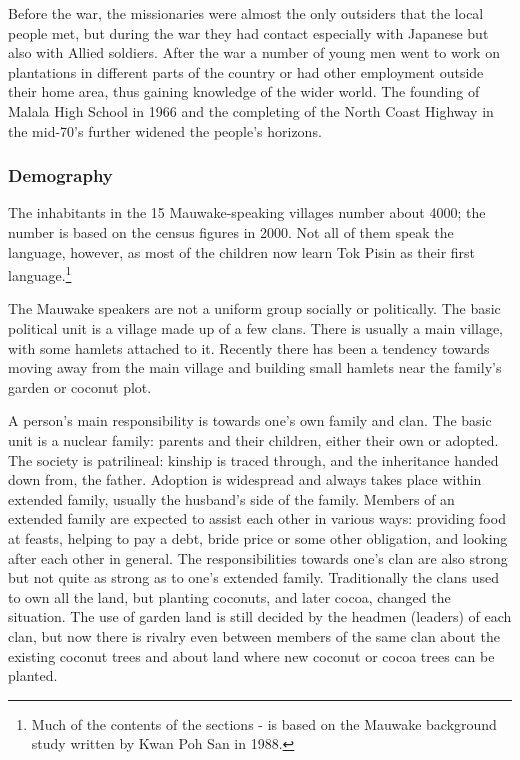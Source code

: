 Before the war, the missionaries were almost the only outsiders that the local people met, but during the war they had contact especially with Japanese but also with Allied soldiers.  After the war a number of young men went to work on plantations in different parts of the country or had other employment outside their home area, thus gaining knowledge of the wider world. The founding of Malala High School in 1966 and the completing of the North Coast Highway in the mid-70's further widened the people's horizons.

\subsubsection{Demography}   \label{sec:1.3.3} 




The inhabitants in the 15 Mauwake-speaking villages number about 4000;  the number is based on the census figures in 2000.  Not all of them speak the language, however, as most of the children now learn Tok Pisin as their first language.\footnote{Much of the contents of the sections - is based on the Mauwake background study written by Kwan Poh San in 1988.} 


The Mauwake speakers are not a uniform group socially or politically. The basic political unit is a village made up of a few clans. There is usually a main village, with some hamlets attached to it.  Recently there has been a tendency towards moving away from the main village and building small hamlets near the family's garden or coconut plot. 

A person's main responsibility is towards one's own family and clan. The basic unit is a nuclear family: parents and their children, either their own or adopted.  The society is patrilineal: kinship is traced through, and the inheritance handed down from, the father. Adoption is widespread and always takes place within extended family, usually the husband's side of the family.  Members of an extended family are expected to assist each other in various ways: providing food at feasts, helping to pay a debt, bride price or some other obligation, and looking after each other in general. The responsibilities towards one's clan are also strong but not quite as strong as to one's extended family.  Traditionally the clans used to own all the land, but planting coconuts, and later cocoa, changed the situation.  The use of garden land is still decided by the headmen (leaders) of each clan, but now there is rivalry even between members of the same clan about the existing coconut trees and about land where new coconut or cocoa trees can be planted.


